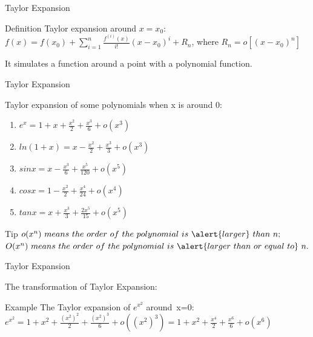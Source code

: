 

\begin{frame}{Taylor Expansion}
	\begin{block}{Definition}
		Taylor expansion around $x=x_0$:\\
		$f(x)=f(x_0)+\sum\limits_{i=1}^n\frac{f^{(i)}(x)}{i!}(x-x_0)^i+R_n$, where $R_n=o[(x-x_0)^n]$\\
	\end{block}

	It simulates a function around a point with a polynomial function.
\end{frame}



\begin{frame}{Taylor Expansion}

	Taylor expansion of some polynomials when x is around 0:
	\begin{enumerate}
		\item $e^x=1+x+\frac{x^2}{2}+\frac{x^3}{6}+o(x^3)$
		\item $ln(1+x)=x-\frac{x^2}{2}+\frac{x^3}{3}+o(x^3)$
		\item $sinx=x-\frac{x^3}{6}+\frac{x^5}{120}+o(x^5)$
		\item $cosx=1-\frac{x^2}{2}+\frac{x^4}{24}+o(x^4)$
		\item $tanx=x+\frac{x^3}{3}+\frac{2x^5}{15}+o(x^5)$
	\end{enumerate}
	\begin{block}{Tip}
		\footnotesize
		$o(x^n)\ means\ the\ order\ of\ the\ polynomial\ is\ \alert{larger}\ than\ n;$\\
		$O(x^n)\ means\ the\ order\ of\ the\ polynomial\ is\ \alert{larger\ than\ or\ equal\ to}\ n.$
		\normalsize
	\end{block}
\end{frame}


\begin{frame}{Taylor Expansion}


	The transformation of Taylor Expansion:
	\begin{block}{Example}
		The Taylor expansion of $e^{x^2}$ around\ x=0:\\
		$e^{x^2}=1+x^2+\frac{(x^2)^2}{2}+\frac{(x^2)^3}{6}+o((x^2)^3)=1+x^2+\frac{x^4}{2}+\frac{x^6}{6}+o(x^6)$
	\end{block}


\end{frame}


